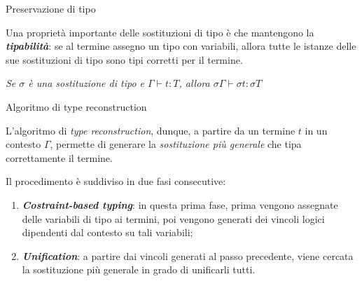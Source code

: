 \documentclass{beamer}
\begin{document}
\begin{tframe}{Preservazione di tipo}

Una proprietà importante delle sostituzioni di tipo è che mantengono la \textbf{\emph{tipabilità}}: se al termine assegno un tipo con variabili, allora tutte le istanze delle sue sostituzioni di tipo sono tipi corretti per il termine.

\vspace{0.8cm}

\begin{theorem}
\textit{Se $\sigma$ è una sostituzione di tipo e $\Gamma \vdash t:T$, allora $\sigma \Gamma \vdash \sigma t : \sigma T$}
\end{theorem}
\end{tframe}


\begin{tframe}{Algoritmo di type reconstruction}

L'algoritmo di \emph{type reconstruction}, dunque, a partire da un termine $t$ in un contesto $\Gamma$, permette di generare la \emph{sostituzione più generale} che tipa correttamente il termine.

\vspace{0.2cm}

Il procedimento è suddiviso in due fasi consecutive:
\vspace{0.4cm}
\begin{enumerate}
\item \emph{\textbf{Costraint-based typing}}: in questa prima fase, prima vengono assegnate delle variabili di tipo ai termini, poi vengono generati dei vincoli logici dipendenti dal contesto su tali variabili;
\item \emph{\textbf{Unification}}: a partire dai vincoli generati al passo precedente, viene cercata la sostituzione più generale in grado di unificarli tutti.
\end{enumerate}
\end{tframe}

\end{document}
